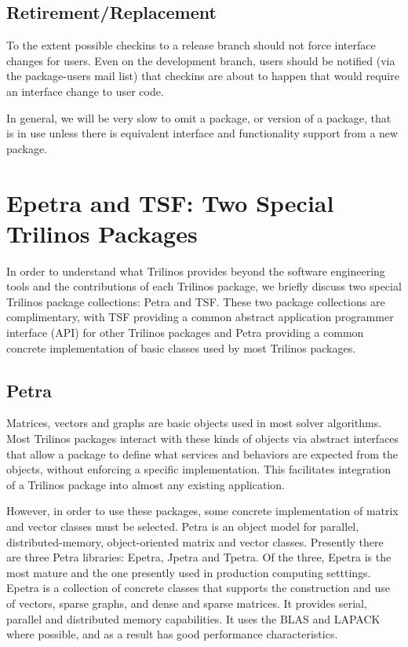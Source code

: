 \documentclass[12pt,strict]{TrilinosDevGuide}
\begin{document}
\subsection{Retirement/Replacement}
To the extent possible checkins to a release branch should not force interface 
changes for users.  Even on the development branch, users should be notified 
(via the package-users mail list) that checkins are about to happen that would 
require an interface change to user code.

In general, we will be very slow to omit a package, or version of a package, 
that is in use unless there is equivalent interface and functionality support 
from a new package.

\section{Epetra and TSF: Two Special Trilinos Packages}
\label{Section:EpetraAndTSF}
In order to understand what Trilinos provides beyond the software
engineering tools and the
contributions of each Trilinos package, we briefly discuss two special
Trilinos package collections: Petra and TSF.  These two package
collections are complimentary,
with TSF providing a common abstract application
programmer interface (API) for other Trilinos packages and Petra
providing a common concrete implementation of basic classes used by most
Trilinos packages.

\subsection{Petra}
Matrices, vectors and graphs are basic objects used in most solver
algorithms. Most Trilinos
packages interact with these kinds of objects via abstract interfaces that
allow a package to define what services and behaviors are expected from the objects,
without enforcing a specific implementation.   This facilitates
integration of a Trilinos package into almost any existing
application.

However, in order to use these packages, some concrete
implementation of matrix and vector classes must be selected.  
Petra is an object model for parallel,
distributed-memory, object-oriented matrix and vector classes.
Presently there are three Petra libraries: Epetra, Jpetra and Tpetra.
Of the three, Epetra is the most mature and the one presently used in
production computing setttings.  Epetra is a collection of concrete
classes that supports the construction and use of vectors, sparse
graphs, and dense and sparse matrices.  It provides serial, parallel and
distributed memory
capabilities.  It uses the BLAS and LAPACK where possible, and as a
result has good performance characteristics.
\end{document}
